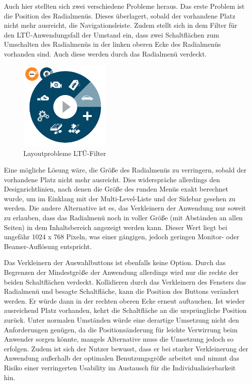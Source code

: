 Auch hier stellten sich zwei verschiedene Probleme heraus. Das erste Problem ist die Position des Radialmenüs. Dieses überlagert, sobald der vorhandene Platz nicht mehr ausreicht, die Navigationsleiste. Zudem stellt sich in dem Filter für den LTÜ-Anwendungsfall der Umstand ein, dass zwei Schaltflächen zum Umschalten des Radialmenüs in der linken oberen Ecke des Radialmenüs vorhanden sind. Auch diese werden durch das Radialmenü verdeckt.\par
\begin{figure}[H]
 \centering
 \includegraphics[width=0.4\textwidth]{grafiken/radial_bug2.png}
 \caption{Layoutprobleme LTÜ-Filter}
 \label{fig:layoutLtueFilter}
\end{figure}
Eine mögliche Lösung wäre, die Größe des Radialmenüs zu verringern, sobald der vorhandene Platz nicht mehr ausreicht. Dies widerspräche allerdings den Designrichtlinien, nach denen die Größe des runden Menüs exakt berechnet wurde, um im Einklang mit der Multi-Level-Liste und der Sidebar gesehen zu werden. Die andere Alternative ist es, das Verkleinern der Anwendung nur soweit zu erlauben, dass das Radialmenü noch in voller Größe (mit Abständen an allen Seiten) in dem Inhaltsbereich angezeigt werden kann. Dieser Wert liegt bei ungefähr 1024 x 768 Pixeln, was einer gängigen, jedoch geringen Monitor- oder Beamer-Auflösung entspricht.\par
Das Verkleinern der Auswahlbuttons ist ebenfalls keine Option. Durch das Begrenzen der Mindestgröße der Anwendung allerdings wird nur die rechte der beiden Schaltflächen verdeckt. Kollidieren durch das Verkleinern des Fensters das Radialmenü und besagte Schaltfläche, kann die Position des Buttons verändert werden. Er würde dann in der rechten oberen Ecke erneut auftauchen. Ist wieder ausreichend Platz vorhanden, kehrt die Schaltfläche an die ursprüngliche Position zurück. Unter normalen Umständen würde eine derartige Umsetzung nicht den Anforderungen genügen, da die Positionsänderung für leichte Verwirrung beim Anwender sorgen könnte, mangels Alternative muss die Umsetzung jedoch so erfolgen. Zudem ist sich der Nutzer bewusst, dass er bei starker Verkleinerung der Anwendung außerhalb der optimalen Benutzungsgröße arbeitet und nimmt das Risiko einer verringerten Usability im Austausch für die Individualisierbarkeit hin.\par
